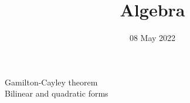 
\title{Algebra}
\author{}
\date{08 May 2022}

\maketitle

\begin{description}
    \item[Gamilton-Cayley theorem] 
    \item[Bilinear and quadratic forms]  
\end{description}

